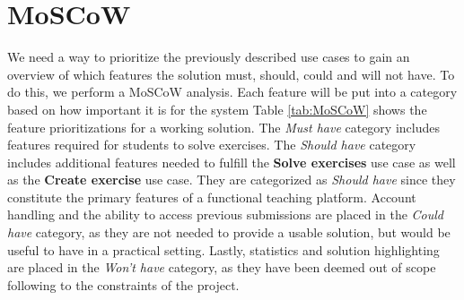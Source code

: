 \section{MoSCoW} \label{sec:MoSCoW}
We need a way to prioritize the previously described use cases to gain an overview of which features the solution must, should, could and will not have.
To do this, we perform a MoSCoW analysis.
Each feature will be put into a category based on how important it is for the system
Table \ref{tab:MoSCoW} shows the feature prioritizations for a working solution.
The \textit{Must have} category includes features required for students to solve exercises.
The \textit{Should have} category includes additional features needed to fulfill the \textbf{Solve exercises} use case as well as the \textbf{Create exercise} use case.
They are categorized as \textit{Should have} since they constitute the primary features of a functional teaching platform.
Account handling and the ability to access previous submissions are placed in the \textit{Could have} category, as they are not needed to provide a usable solution, but would be useful to have in a practical setting.
Lastly, statistics and solution highlighting are placed in the \textit{Won't have} category, as they have been deemed out of scope following to the constraints of the project.


